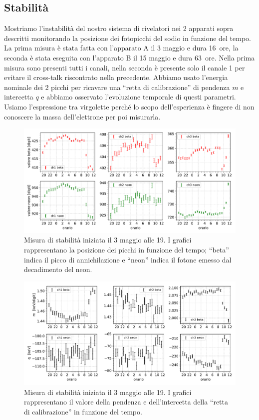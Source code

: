 \subsection{Stabilità}

Mostriamo l'instabilità del nostro sistema di rivelatori nei 2 apparati sopra descritti monitorando la posizione dei fotopicchi del sodio in funzione del tempo.
La prima misura è stata fatta con l'apparato A il 3 maggio e dura \SI{16}{ore}, la seconda  è stata eseguita con l'apparato B il 15 maggio e dura \SI{63}{ore}.
Nella prima misura sono presenti tutti i canali, nella seconda è presente solo il canale 1 per evitare il cross-talk riscontrato nella precedente.
Abbiamo usato l'energia nominale dei 2 picchi per ricavare una ``retta di calibrazione'' di pendenza $m$ e intercetta $q$ e abbiamo osservato l'evoluzione temporale di questi parametri. Usiamo l'espressione tra virgolette perché lo scopo dell'esperienza è fingere di non conoscere la massa dell'elettrone per poi misurarla.

\begin{figure}[h]
\centering
\includegraphics[width=\textwidth]{immagini/0503_picchi}
\caption{Misura di stabilità iniziata il 3 maggio alle 19. I grafici rappresentano la posizione dei picchi in funzione del tempo; ``beta'' indica il picco di annichilazione e ``neon'' indica il fotone emesso dal decadimento del neon.}
\label{picchi1}
\end{figure}

\begin{figure}[h]
\centering
\includegraphics[width=\textwidth]{immagini/0503_rette}
\caption{Misura di stabilità iniziata il 3 maggio alle 19. I grafici rappresentano il valore della pendenza e dell'intercetta della ``retta di calibrazione'' in funzione del tempo.}
\label{rette1}
\end{figure}

